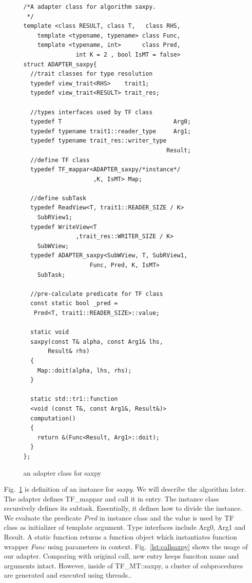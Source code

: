 \documentclass[10pt, conference, compsocconf]{IEEEtran}
\begin{document}
\begin{figure}[!htp]
\begin{minipage}[tb]{\linewidth}
\makebox[\textwidth]{\hrulefill}
\begin{small}
\begin{verbatim}
/*A adapter class for algorithm saxpy.
 */
template <class RESULT, class T,   class RHS, 
    template <typename, typename> class Func,
    template <typename, int>      class Pred,
               int K = 2 , bool IsMT = false>
struct ADAPTER_saxpy{
  //trait classes for type resolution
  typedef view_trait<RHS>    trait1;
  typedef view_trait<RESULT> trait_res;
  
  //types interfaces used by TF class
  typedef T                                Arg0;
  typedef typename trait1::reader_type     Arg1;
  typedef typename trait_res::writer_type 
                                         Result;
  //define TF class
  typedef TF_mappar<ADAPTER_saxpy/*instance*/
                    ,K, IsMT> Map;

  //define subTask
  typedef ReadView<T, trait1::READER_SIZE / K>
    SubRView1;
  typedef WriteView<T 
               ,trait_res::WRITER_SIZE / K>
    SubWView;
  typedef ADAPTER_saxpy<SubWView, T, SubRView1, 
                   Func, Pred, K, IsMT>
    SubTask;

  //pre-calculate predicate for TF class
  const static bool _pred = 
   Pred<T, trait1::READER_SIZE>::value;

  static void 
  saxpy(const T& alpha, const Arg1& lhs, 
       Result& rhs)
  {
    Map::doit(alpha, lhs, rhs);
  }
  
  static std::tr1::function
  <void (const T&, const Arg1&, Result&)>
  computation() 
  {
    return &(Func<Result, Arg1>::doit);
  }
};
\end{verbatim}
\end{small}
\vspace{-1ex}\makebox[\textwidth]{\hrulefill}
\end{minipage}
\caption{an adapter class for saxpy}\label{lst:adaptersaxpy}
\end{figure}
Fig.~\ref{lst:adaptersaxpy} is definition of an instance for
\emph{saxpy}. We will describe the algorithm later. The adapter defines TF\_mappar and call it in entry. 
The instance class recursively defines its subtask. Essentially, 
it defines how to divide the instance.
We evaluate the predicate \emph{Pred} in instance class and the value
is used by TF class as initializer of  template argument.
Type interfaces include Arg0, Arg1 and Result. A static function returns a function object which
instantiates function wrapper \emph{Func} using parameters in context. Fig.~\ref{lst:callsaxpy}
shows the usage of our adapter. Comparing with original call, new
entry keeps funciton name and arguments intact. However, inside of
TF\_MT::saxpy, a cluster of subprocedures are generated and executed
using threads..
\end{document}
